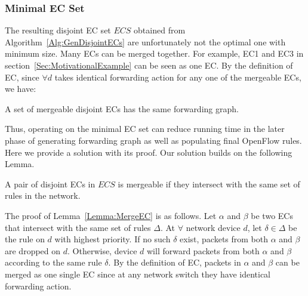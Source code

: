 \subsubsection{Minimal EC Set}
The resulting disjoint EC set $ECS$ obtained from Algorithm~\ref{Alg:GenDisjointECs} are unfortunately not the optimal one with minimum size.
Many ECs can be merged together.
For example, EC1 and EC3 in section~\ref{Sec:MotivationalExample} can be seen as one EC.
By the definition of EC, since $\forall d$ takes identical forwarding action for any one of
the mergeable ECs, we have:
\begin{lemma}
A set of mergeable disjoint ECs has the same forwarding graph.
\label{Lemma:MergeFG}
\end{lemma}
Thus, operating on the minimal EC set can reduce running time in the later phase of
generating forwarding graph as well as populating final OpenFlow rules.
Here we provide a solution with its proof.
Our solution builds on the following Lemma.
\begin{lemma}
A pair of disjoint ECs in $ECS$ is mergeable if they intersect with
the same set of rules in the network.
\label{Lemma:MergeEC}
\end{lemma}
The proof of Lemma~\ref{Lemma:MergeEC} is as follows.
Let $\alpha$ and $\beta$ be two ECs that intersect with the same set of rules $\Delta$.
At $\forall$ network device $d$, let $\delta \in \Delta$ be the rule on $d$ with
highest priority.
If no such $\delta$ exist, packets from both $\alpha$ and $\beta$ are dropped on $d$.
Otherwise, device $d$ will forward packets from both $\alpha$ and $\beta$ according to the same
rule $\delta$.
By the definition of EC, packets in $\alpha$ and $\beta$ can be merged as one single EC
since at any network switch they have identical forwarding action.


